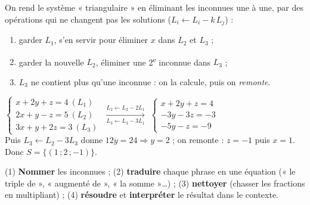 \documentclass[11pt,a4paper]{article}
\begin{document}
\begin{methode}
On rend le système « triangulaire » en éliminant les inconnues une à une, par des opérations qui ne
changent pas les solutions ($L_i\leftarrow L_i-k\,L_j$) :
\begin{enumerate}[leftmargin=1.6em,topsep=1pt,itemsep=0.5pt]
  \item garder $L_1$, s'en servir pour éliminer $x$ dans $L_2$ et $L_3$ ;
  \item garder la nouvelle $L_2$, éliminer une 2\textsuperscript{e} inconnue dans $L_3$ ;
  \item $L_3$ ne contient plus qu'une inconnue : on la calcule, puis on \emph{remonte}.
\end{enumerate}
\end{methode}

\begin{exemplebox}
$\begin{cases} x+2y+z=4\ (L_1)\\ 2x+y-z=5\ (L_2)\\ 3x+y+2z=3\ (L_3)\end{cases}$
$\xrightarrow[L_3\leftarrow L_3-3L_1]{L_2\leftarrow L_2-2L_1}$
$\begin{cases} x+2y+z=4\\ -3y-3z=-3\\ -5y-z=-9\end{cases}$\\[3pt]
Puis $L_3\leftarrow L_2-3L_3$ donne $12y=24\Rightarrow y=2$ ; on remonte : $z=-1$ puis $x=1$.
Donc $S=\{(1\,;2\,;-1)\}$.
\end{exemplebox}

\begin{methode}
(1) \textbf{Nommer} les inconnues ; (2) \textbf{traduire} chaque phrase en une équation (« le triple de »,
« augmenté de », « la somme »\dots) ; (3) \textbf{nettoyer} (chasser les fractions en multipliant) ;
(4) \textbf{résoudre} et \textbf{interpréter} le résultat dans le contexte.
\end{methode}
\end{document}
